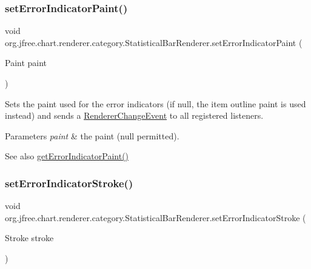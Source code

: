 \subsubsection{\texorpdfstring{set\+Error\+Indicator\+Paint()}{setErrorIndicatorPaint()}}
{\footnotesize\ttfamily void org.\+jfree.\+chart.\+renderer.\+category.\+Statistical\+Bar\+Renderer.\+set\+Error\+Indicator\+Paint (\begin{DoxyParamCaption}\item[{Paint}]{paint }\end{DoxyParamCaption})}

Sets the paint used for the error indicators (if {\ttfamily null}, the item outline paint is used instead) and sends a \mbox{\hyperlink{}{Renderer\+Change\+Event}} to all registered listeners.


\begin{DoxyParams}{Parameters}
{\em paint} & the paint ({\ttfamily null} permitted).\\
\hline
\end{DoxyParams}
\begin{DoxySeeAlso}{See also}
\mbox{\hyperlink{classorg_1_1jfree_1_1chart_1_1renderer_1_1category_1_1_statistical_bar_renderer_adf1749e835752e57cb21e5c52f4ddeb6}{get\+Error\+Indicator\+Paint()}} 
\end{DoxySeeAlso}
\mbox{\label{classorg_1_1jfree_1_1chart_1_1renderer_1_1category_1_1_statistical_bar_renderer_a5858ebcf353d862a3a30986c4e2ef65f}} 
\subsubsection{\texorpdfstring{set\+Error\+Indicator\+Stroke()}{setErrorIndicatorStroke()}}
{\footnotesize\ttfamily void org.\+jfree.\+chart.\+renderer.\+category.\+Statistical\+Bar\+Renderer.\+set\+Error\+Indicator\+Stroke (\begin{DoxyParamCaption}\item[{Stroke}]{stroke }\end{DoxyParamCaption})}

